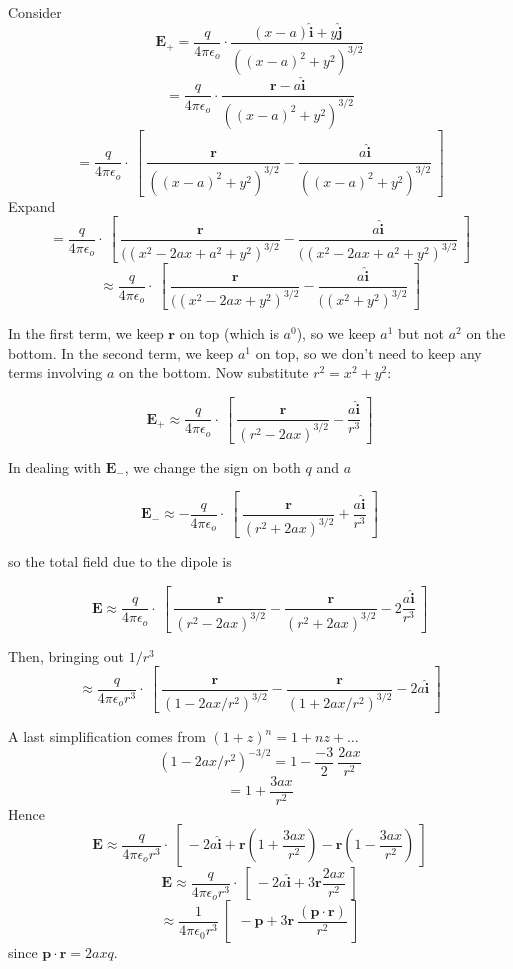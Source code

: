 \documentclass[11pt, oneside]{article}
\begin{document}
Consider 
\[ \mathbf{E}_+ = \frac{q}{4 \pi \epsilon_o} \cdot  \frac{(x - a) \hat{\mathbf{i}} + y \hat{\mathbf{j}}}{((x - a)^2 + y^2)^{3/2}} \]
\[ = \frac{q}{4 \pi \epsilon_o} \cdot  \frac{\mathbf{r} - a \hat{\mathbf{i}} }{((x - a)^2 + y^2)^{3/2}} \]
\[ = \frac{q}{4 \pi \epsilon_o} \cdot \ [ \  \frac{\mathbf{r} }{((x - a)^2 + y^2)^{3/2}} - \frac{a \hat{\mathbf{i}}}{((x - a)^2 + y^2)^{3/2}} \ ] \]
Expand
\[ = \frac{q}{4 \pi \epsilon_o} \cdot \ [ \  \frac{\mathbf{r} }{((x^2 - 2ax + a^2 + y^2)^{3/2}} - \frac{a \hat{\mathbf{i}}}{((x^2 - 2ax + a^2 + y^2)^{3/2}} \ ] \]
\[ \approx \frac{q}{4 \pi \epsilon_o} \cdot \ [ \  \frac{\mathbf{r} }{((x^2 - 2ax + y^2)^{3/2}} - \frac{a \hat{\mathbf{i}}}{((x^2 + y^2)^{3/2}} \ ] \]

In the first term, we keep $\mathbf{r}$ on top (which is $a^0$), so we keep $a^1$ but not $a^2$ on the bottom.   In the second term, we keep $a^1$ on top, so we don't need to keep any terms involving $a$ on the bottom.  Now substitute $r^2 = x^2 + y^2$:

\[ \mathbf{E}_+ \approx \frac{q}{4 \pi \epsilon_o} \cdot \ [ \  \frac{\mathbf{r} }{(r^2 - 2ax)^{3/2}} - \frac{a \hat{\mathbf{i}}}{r^3} \ ] \]

In dealing with $\mathbf{E}_-$, we change the sign on both $q$ and $a$

\[ \mathbf{E}_- \approx - \frac{q}{4 \pi \epsilon_o} \cdot \ [ \  \frac{\mathbf{r} }{(r^2 + 2ax)^{3/2}} + \frac{a \hat{\mathbf{i}}}{r^3} \ ] \]

so the total field due to the dipole is

\[ \mathbf{E} \approx \frac{q}{4 \pi \epsilon_o} \cdot \ [ \  \frac{\mathbf{r} }{(r^2 - 2ax)^{3/2}} -  \frac{\mathbf{r} }{(r^2 + 2ax)^{3/2}} - 2 \frac{a \hat{\mathbf{i}}}{r^3} \ ] \]

Then, bringing out $1/r^3$
\[ \approx \frac{q}{4 \pi \epsilon_o r^3} \cdot \ [ \  \frac{\mathbf{r} }{(1 - 2ax/r^2)^{3/2}} -  \frac{\mathbf{r} }{(1 + 2ax/r^2)^{3/2}} - 2 a \hat{\mathbf{i}} \ ] \]

A last simplification comes from $(1 + z)^n = 1 + nz + \dots$
\[ (1 - 2ax/r^2)^{-3/2} = 1 - \frac{-3}{2} \ \frac{2ax}{r^2} \]
\[ = 1 +  \frac{3ax}{r^2} \]
Hence
\[ \mathbf{E} \approx \frac{q}{4 \pi \epsilon_o r^3} \cdot \ [ \ - 2 a \hat{\mathbf{i}} + \mathbf{r} (1 + \frac{3ax}{r^2}) - \mathbf{r} (1 - \frac{3ax}{r^2}) \ ] \]
\[ \mathbf{E} \approx \frac{q}{4 \pi \epsilon_o r^3} \cdot \ [ \ - 2 a \hat{\mathbf{i}} + 3 \mathbf{r} \frac{2ax}{r^2} \ ] \]
\[ \approx \frac{1}{4 \pi \epsilon_0 r^3} \ [ \  \ - \mathbf{p} + 3 \mathbf{r} \ \frac{(\mathbf{p} \cdot \mathbf{r} )}{r^2} \ ] \]
since $\mathbf{p} \cdot \mathbf{r} = 2axq$.
\end{document}
